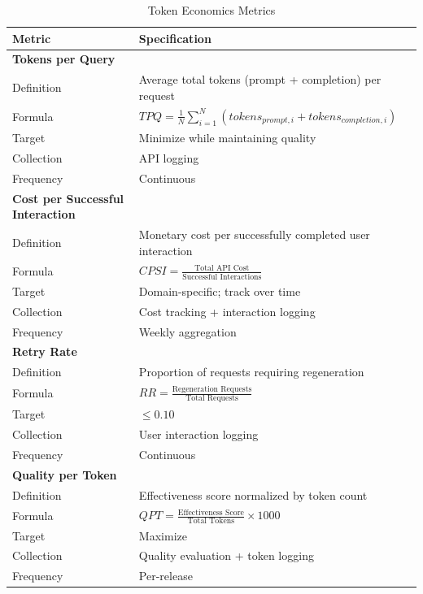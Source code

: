 \begin{table}[!htbp]
\centering
\caption{Token Economics Metrics}
\label{tab:token_metrics}
\small
\begin{tabularx}{\linewidth}{@{}l X@{}}
\toprule
\textbf{Metric} & \textbf{Specification} \\
\midrule
\textbf{Tokens per Query} & \\
Definition & Average total tokens (prompt + completion) per request \\
Formula & $TPQ = \frac{1}{N}\sum_{i=1}^{N}(tokens_{prompt,i} + tokens_{completion,i})$ \\
Target & Minimize while maintaining quality \\
Collection & API logging \\
Frequency & Continuous \\
\addlinespace

\textbf{Cost per Successful Interaction} & \\
Definition & Monetary cost per successfully completed user interaction \\
Formula & $CPSI = \frac{\text{Total API Cost}}{\text{Successful Interactions}}$ \\
Target & Domain-specific; track over time \\
Collection & Cost tracking + interaction logging \\
Frequency & Weekly aggregation \\
\addlinespace

\textbf{Retry Rate} & \\
Definition & Proportion of requests requiring regeneration \\
Formula & $RR = \frac{\text{Regeneration Requests}}{\text{Total Requests}}$ \\
Target & $\leq 0.10$ \\
Collection & User interaction logging \\
Frequency & Continuous \\
\addlinespace

\textbf{Quality per Token} & \\
Definition & Effectiveness score normalized by token count \\
Formula & $QPT = \frac{\text{Effectiveness Score}}{\text{Total Tokens}} \times 1000$ \\
Target & Maximize \\
Collection & Quality evaluation + token logging \\
Frequency & Per-release \\
\bottomrule
\end{tabularx}
\end{table}


